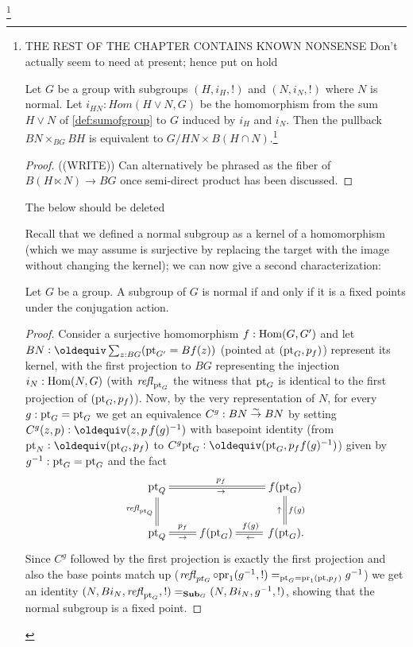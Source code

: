 \footnote{\color{blue}THE REST OF THE CHAPTER CONTAINS KNOWN NONSENSE \tiny Don't actually seem to need at present; hence put on hold
\begin{lemma}
  \label{lem:iso2}
  Let $G$ be a group with subgroups $(H,i_H,!)$ and $(N,i_N,!)$ where $N$ is normal. Let $i_{HN}:Hom(H \vee N,G)$ be the homomorphism from the sum $H\vee N$ of \cref{def:sumofgroup} to $G$ induced by $i_H$ and $i_N$.  Then 
the pullback $BN\times_{BG}BH$
is equivalent to $G/{HN}\times B(H\cap N)$.\footnote{display the equivalence}
\end{lemma}
\begin{proof}
  ((WRITE)) Can alternatively be phrased as the fiber of $B(H\ltimes N)\to BG$ once semi-direct product has been discussed.
\end{proof}

The below should be deleted


Recall that we defined a normal subgroup as a kernel of a homomorphism (which we may assume is surjective by replacing the target with the image without changing the kernel); we can now give a second characterization:
\begin{lemma}
  \label{lem:normalisfixed}
  Let $G$ be a group.  A subgroup of $G$ is normal if and only if it is a fixed points under the conjugation action.
\end{lemma}
\begin{proof}
  Consider a surjective homomorphism $f:\mathrm{Hom}(G,G')$ and let $BN\defequi\sum_{z:BG}(\pt_{G'}=Bf(z))$ (pointed at $(\mathrm{pt}_G,p_f)$) represent its kernel, with the first projection to $BG$ representing the injection $i_N:\mathrm{Hom}(N,G)$ (with $\mathop{\mathit{refl}_{\mathrm{pt}_G}}$ the witness that $\mathrm{pt}_G$ is identical to the first projection of $(\mathrm{pt}_G,p_f)$).   Now, by the very representation of $N$, for every $g:\mathrm{pt}_G=\mathrm{pt}_G$ we get an equivalence $C^g:BN\overset\sim\to BN$ by setting $C^g(z,p)\defequi(z,p\,f(g)^{-1})$ with basepoint identity (from $\pt_N\defequi(\pt_G,p_f)$ to $C^g\pt_G\defequi (\pt_G,p_ff(g)^{-1})$) given by $g^{-1}:\mathrm{pt}_G=\mathrm{pt}_G$ and the fact 
$$\xymatrix{\pt_Q\ar@{=}[rr]^{p_f}_\to\ar@{=}[d]_{\refl{\pt_Q}}&&f(\pt_G)\\
\pt_Q\ar@{=}[r]^-{p_f}_-\to&f(\pt_G)&\,f(\pt_G).\ar@{=}[l]^\gets_{f(g)}\ar@{=}[u]^\uparrow_{f(g)}}
$$
Since $C^g$ followed by the first projection is exactly the first projection and also the base points match up (\ie $\mathop{\mathit{refl}_{pt_G}}\circ\mathrm{pr}_1(g^{-1},!)=_{\mathrm{pt}_G=\mathrm{pr}_1(\mathrm{pt},p_f)}g^{-1}$) we get an identity $(N,Bi_N,\mathop{\mathit{refl}_{\mathrm{pt}_G}},!)=_{\mathbf{Sub}_G}(N,Bi_N,g^{-1},!)$, showing that the normal subgroup is a fixed point. 


\end{proof}}
